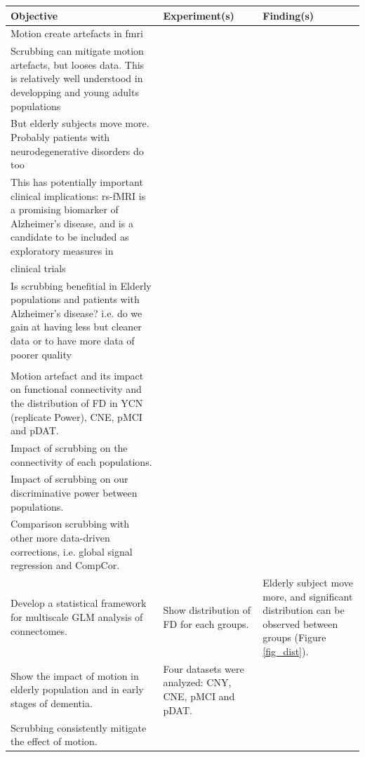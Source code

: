 \documentclass[authoryear]{elsarticle}
\begin{document}
\begin{landscape}

\begin{table}[!ht]
 \begin{center}
  \begin{tabular}{p{6cm}p{6cm}p{10cm}}
   Objective & Experiment(s) & Finding(s)\\
   \hline
   
    Motion create artefacts in fmri\\
    Scrubbing can mitigate motion artefacts, but looses data. This is relatively well understood in developping and young adults populations\\
    But elderly subjects move more. Probably patients with neurodegenerative disorders do too\\
    This has potentially important clinical implications: rs-fMRI is a promising biomarker of Alzheimer's disease, and is a candidate to be included as exploratory measures in\\ clinical trials\\
    Is scrubbing benefitial in Elderly populations and patients with Alzheimer's disease? i.e. do we gain at having less but cleaner data or to have more data of poorer quality\\
 
    \\Motion artefact and its impact on functional connectivity and the distribution of FD in YCN (replicate Power), CNE, pMCI and pDAT.
    \\Impact of scrubbing on the connectivity of each populations.
    \\Impact of scrubbing on our discriminative power between populations.
    \\Comparison scrubbing with other more data-driven corrections, i.e. global signal regression and CompCor.
 
   \\Develop a statistical framework for multiscale GLM analysis of connectomes. & Show distribution of FD for each groups. & Elderly subject move more, and significant distribution can be observed between groups (Figure \ref{fig_dist}).
   
   \\Show the impact of motion in elderly population and in early stages of dementia. & Four datasets were analyzed: CNY, CNE, pMCI and pDAT. 
   
   \\Scrubbing consistently mitigate the effect of motion. & 
   

\end{tabular}
\end{center}
\end{table}
\end{landscape}
\end{document}
